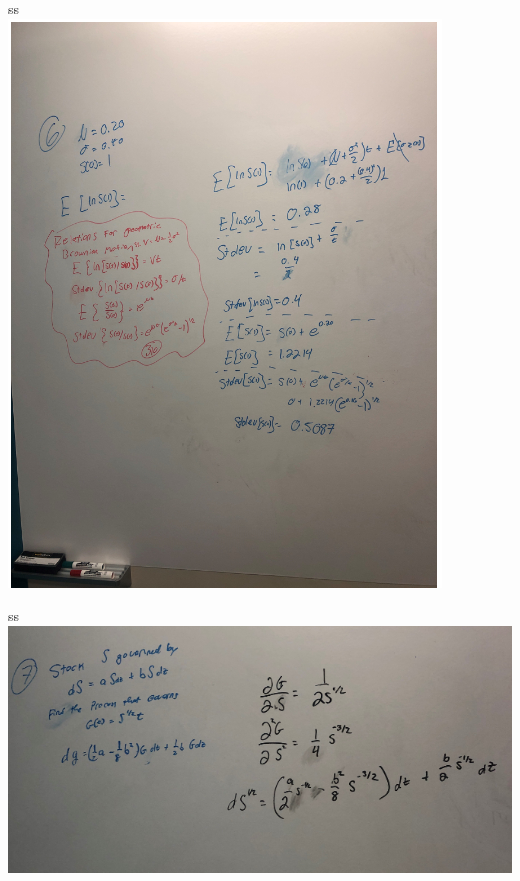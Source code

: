 \documentclass[12pt]{article}
\newenvironment{problem}[3][Problem]{\begin{trivlist}
\item[\hskip \labelsep {\bfseries #1}\hskip \labelsep {\bfseries #2.}]}{\end{trivlist}}
\begin{document}
  
  \begin{problem}{6} .ss \\
\includegraphics[width=\textwidth ]{mod10p6c.png}

  \end{problem}
  
  \begin{problem}{7} .ss \\
\includegraphics[width=\textwidth ]{mod10p7c.png}

  \end{problem}
  
\end{document}
